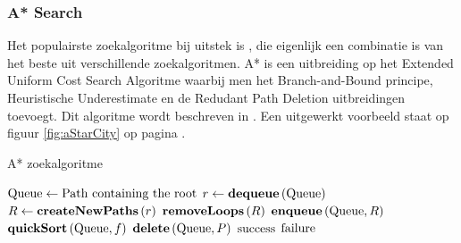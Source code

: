 \subsubsection{A* Search}
Het populairste zoekalgoritme bij uitstek is , die eigenlijk een combinatie is van het beste uit verschillende zoekalgoritmen. A* is een uitbreiding op het Extended Uniform Cost Search Algoritme waarbij men het Branch-and-Bound principe, Heuristische Underestimate en de Redudant Path Deletion uitbreidingen toevoegt. Dit algoritme wordt beschreven in . Een uitgewerkt voorbeeld staat op figuur \ref{fig:aStarCity} op pagina \pageref{fig:aStarCity}.
\begin{algorithm}[htb]
\caption{A* zoekalgoritme}
\label{alg:aStar}
\begin{algorithmic}[1]
\STATE $\mbox{Queue}\leftarrow\mbox{Path containing the root}$
\WHILE{$\notempty{\queue}\wedge\neg\goalreached{\queue\left[0\right]}$}
\STATE $r\leftarrow\mbox{\bf dequeue}\left( \mbox{Queue} \right)$
\STATE $R\leftarrow\mbox{\bf createNewPaths}\left( r \right)$
\STATE $\mbox{\bf removeLoops}\left( R \right)$
\STATE $\mbox{\bf enqueue}\left( \mbox{Queue},R \right)$
\STATE $\mbox{\bf quickSort}\left( \mbox{Queue},f \right)$
\STATE{}
\STATE $\mbox{\bf delete}\left( \mbox{Queue},P \right)$
\ENDIF
\ENDFOR
\ENDWHILE
\IF{$\goalreached{\queue\left[0\right]}$}
\RETURN $\mbox{success}$
\ELSE
\RETURN $\mbox{failure}$
\ENDIF
\end{algorithmic}
\end{algorithm}

